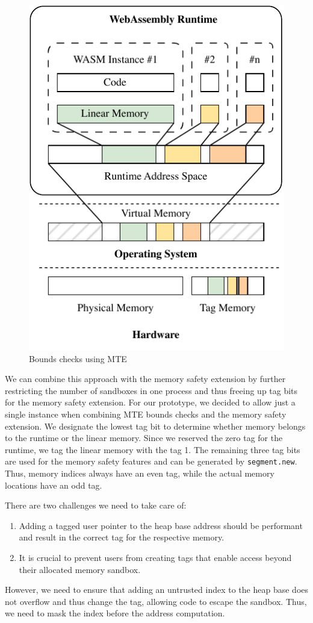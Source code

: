 \begin{figure}[t]
  \centering
  \includegraphics[scale=1]{figures/build/system-design-1}
  \caption{Bounds checks using MTE}
  \label{fig:system-design-sandboxing}
\end{figure}

We can combine this approach with the memory safety extension by further restricting the number of sandboxes in one process and thus freeing up tag bits for the memory safety extension.
For our prototype, we decided to allow just a single instance when combining \ac{MTE} bounds checks and the memory safety extension.
We designate the lowest tag bit to determine whether memory belongs to the runtime or the linear memory.
Since we reserved the zero tag for the runtime, we tag the linear memory with the tag 1.
The remaining three tag bits are used for the memory safety features and can be generated by \texttt{segment.new}.
Thus, memory indices always have an even tag, while the actual memory locations have an odd tag.

There are two challenges we need to take care of:
\begin{enumerate}
  \item Adding a tagged user pointer to the heap base address should be performant and result in the correct tag for the respective memory.
  \item It is crucial to prevent users from creating tags that enable access beyond their allocated memory sandbox.
\end{enumerate}
However, we need to ensure that adding an untrusted index to the heap base does not overflow and thus change the tag, allowing code to escape the sandbox.
Thus, we need to mask the index before the address computation.

